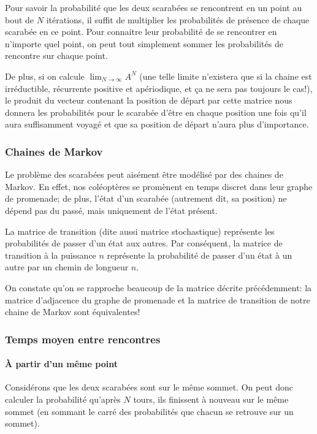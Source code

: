   Pour savoir la probabilité que les deux scarabées se rencontrent en un point
  au bout de $N$ itérations, il suffit de multiplier les probabilités de
  présence de chaque scarabée en ce point. Pour connaitre leur probabilité de se
  rencontrer en n'importe quel point, on peut tout simplement sommer les
  probabilités de rencontre sur chaque point.

  De plus, si on calcule $\displaystyle\lim_{N \to \infty} A^N$ (une telle limite n'existera
  que si la chaine est irréductible, récurrente positive et apériodique, et ça
  ne sera pas toujours le cas!), le produit du vecteur contenant la position de
  départ par cette matrice nous donnera les probabilités pour le scarabée
  d'être en chaque position une fois qu'il aura suffisamment voyagé et que sa
  position de départ n'aura plus d'importance.

  \subsubsection{Chaines de Markov}
    Le problème des scarabées peut aisément être modélisé par des chaines de
    Markov. En effet, nos coléoptères se promènent en temps discret dans leur
    graphe de promenade; de plus, l'état d'un scarabée (autrement dit, sa
    position) ne dépend pas du passé, mais uniquement de l'état présent.

    La matrice de transition (dite aussi matrice stochastique) représente les
    probabilités de passer d'un état aux autres. Par conséquent, la matrice de
    transition à la puissance $n$ représente la probabilité de passer d'un état
    à un autre par un chemin de longueur $n$.

    On constate qu'on se rapproche beaucoup de la matrice décrite précédemment:
    la matrice d'adjacence du graphe de promenade et la matrice de transition
    de notre chaine de Markov sont équivalentes!

  \subsubsection{Temps moyen entre rencontres}
    \paragraph{À partir d'un même point}
      Considérons que les deux scarabées sont sur le même sommet. On peut donc
      calculer la probabilité qu'après $N$ tours, ils finissent à nouveau sur
      le même sommet (en sommant le carré des probabilités que chacun se retrouve
      sur un sommet).

